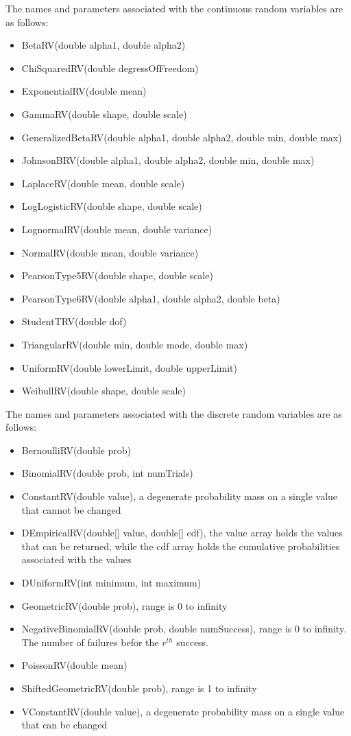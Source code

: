 \documentclass[
]{book}
\providecommand{\tightlist}{%
  \setlength{\itemsep}{0pt}\setlength{\parskip}{0pt}}
\theoremstyle{definition}
\theoremstyle{definition}
\theoremstyle{definition}
\theoremstyle{definition}
\theoremstyle{remark}
\begin{document}
The names and parameters associated with the continuous random variables
are as follows:

\begin{itemize}
\tightlist
\item
  BetaRV(double alpha1, double alpha2)
\item
  ChiSquaredRV(double degressOfFreedom)
\item
  ExponentialRV(double mean)
\item
  GammaRV(double shape, double scale)
\item
  GeneralizedBetaRV(double alpha1, double alpha2, double min, double max)
\item
  JohnsonBRV(double alpha1, double alpha2, double min, double max)
\item
  LaplaceRV(double mean, double scale)
\item
  LogLogisticRV(double shape, double scale)
\item
  LognormalRV(double mean, double variance)
\item
  NormalRV(double mean, double variance)
\item
  PearsonType5RV(double shape, double scale)
\item
  PearsonType6RV(double alpha1, double alpha2, double beta)
\item
  StudentTRV(double dof)
\item
  TriangularRV(double min, double mode, double max)
\item
  UniformRV(double lowerLimit, double upperLimit)
\item
  WeibullRV(double shape, double scale)
\end{itemize}

The names and parameters associated with the discrete random variables
are as follows:

\begin{itemize}
\tightlist
\item
  BernoulliRV(double prob)
\item
  BinomialRV(double prob, int numTrials)
\item
  ConstantRV(double value), a degenerate probability mass on a single
  value that cannot be changed
\item
  DEmpiricalRV(double{[}{]} value, double{[}{]} cdf), the value array
  holds the values that can be returned, while the cdf array holds the
  cumulative probabilities associated with the values
\item
  DUniformRV(int minimum, int maximum)
\item
  GeometricRV(double prob), range is 0 to infinity
\item
  NegativeBinomialRV(double prob, double numSuccess), range is 0 to
  infinity. The number of failures befor the \(r^{th}\) success.
\item
  PoissonRV(double mean)
\item
  ShiftedGeometricRV(double prob), range is 1 to infinity
\item
  VConstantRV(double value), a degenerate probability mass on a single
  value that can be changed
\end{itemize}
\end{document}

